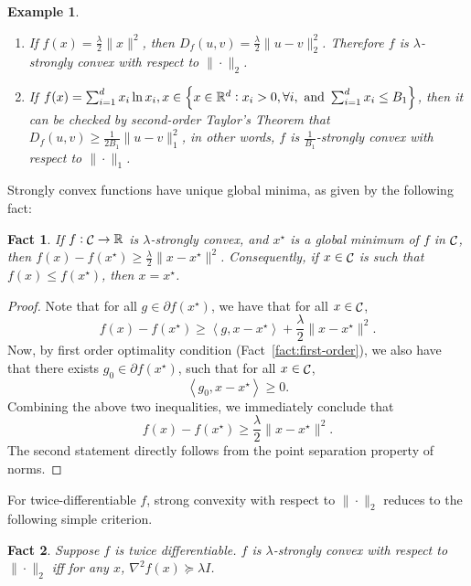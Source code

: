 \documentclass{article}
\newtheorem{example}{Example}
\newtheorem{fact}{Fact}
\DeclareMathOperator*{\Ccal}{{\cal C}}
\newcommand{\RR}{\mathbb{R}} %
\newcommand{\inner}[2]{\left\langle #1,#2 \right\rangle}
\begin{document}


\begin{example}
\begin{enumerate}
  \item If $f(x) = \frac{\lambda}{2}\|x\|^2$, then $D_f(u, v) = \frac{\lambda}{2}\|u - v\|_2^2$. Therefore $f$ is $\lambda$-strongly convex with respect to $\| \cdot \|_2$.
  \item If $f(x) = \sum_{i=1}^d x_i \ln x_i, x \in \cbr{x \in \RR^d: x_i > 0, \forall i, \text{ and } \sum_{i=1}^d x_i \leq B_1}$,
  then it can be checked by second-order Taylor's Theorem that $D_f(u, v) \geq \frac{1}{2B_1}\|u - v\|_1^2$, in other words, $f$ is $\frac{1}{B_1}$-strongly convex with respect to $\| \cdot \|_1$.
\end{enumerate}
\end{example}

Strongly convex functions have unique global minima, as given by the following fact:
\begin{fact}
If $f: \Ccal \to \RR$ is $\lambda$-strongly convex, and $x^\star$ is a global minimum of $f$ in $\Ccal$, then
$f(x) - f(x^\star) \geq \frac{\lambda}2 \| x - x^\star \|^2$. Consequently, if $x \in \Ccal$ is such that $f(x) \leq f(x^\star)$, then $x = x^\star$.
\label{fact:sc-optimal}
\end{fact}
\begin{proof}
Note that for all $g \in \partial f(x^\star)$, we have that for all $x \in \Ccal$,
\[ f(x) - f(x^\star) \geq \inner{g}{x - x^\star} + \frac{\lambda}2 \| x - x^\star \|^2. \]
Now, by first order optimality condition (Fact~\ref{fact:first-order}), we also have that there exists $g_0 \in \partial f(x^\star)$, such that for all $x \in \Ccal$,
\[ \inner{g_0}{x - x^\star} \geq 0. \]
Combining the above two inequalities, we immediately conclude that
\[ f(x) - f(x^\star) \geq \frac{\lambda}2 \| x - x^\star \|^2.  \]
The second statement directly follows from the point separation property of norms.
\end{proof}

For twice-differentiable $f$,
strong convexity with respect to $\| \cdot \|_2$ reduces to the following simple
criterion.
\begin{fact}
Suppose $f$ is twice differentiable.
$f$ is $\lambda$-strongly convex with respect to $\| \cdot \|_2$ iff for any $x$,
$\nabla^2 f(x) \succeq \lambda I$.
\end{fact}
\end{document}
